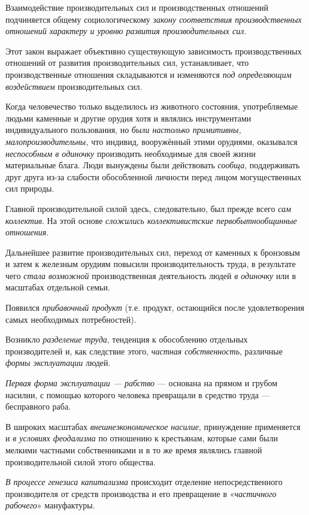 \documentclass[a4paper,14pt,russian]{extreport}
\begin{document}
Взаимодействие производительных сил и производственных отношений подчиняется общему социологическому \emph{закону соответствия производственных отношений характеру и уровню развития производительных сил.}

Этот закон выражает объективно существующую зависимость производственных отношений от развития производительных сил, устанавливает, что производственные отношения складываются и изменяются \emph{под определяющим воздействием} производительных сил.

Когда человечество только выделилось из животного состояния, употребляемые людьми каменные и другие орудия хотя и являлись инструментами индивидуального пользования, но \emph{были настолько примитивны, малопроизводительны,} что индивид, вооружённый этими орудиями, оказывался \emph{неспособным в одиночку} производить необходимые для своей жизни материальные блага. Люди вынуждены были действовать \emph{сообща}, поддерживать друг друга из-за слабости обособленной личности перед лицом могущественных сил природы.

Главной производительной силой здесь, следовательно, был прежде всего \emph{сам коллектив}. На этой основе \emph{сложились коллективистские первобытнообщинные отношения}.

Дальнейшее развитие производительных сил, переход от каменных к бронзовым и затем к железным орудиям повысили производительность труда, в результате чего \emph{стала возможной} производственная деятельность людей \emph{в одиночку} или в масштабах отдельной семьи.

Появился \emph{прибавочный продукт} (т.е. продукт, остающийся после удовлетворения самых необходимых потребностей).

Возникло \emph{разделение труда}, тенденция к обособлению отдельных производителей и, как следствие этого, \emph{частная собственность}, различные \emph{формы эксплуатации} людей.

\emph{Первая форма эксплуатации --- рабство} --- основана на прямом и грубом насилии, с помощью которого человека превращали в средство труда --- бесправного раба.

В широких масштабах \emph{внешнеэкономическое насилие}, принуждение применяется и \emph{в условиях феодализма} по отношению к крестьянам, которые сами были мелкими частными собственниками и в то же время являлись главной производительной силой этого общества.

\emph{В процессе генезиса капитализма} происходит отделение непосредственного производителя от средств производства и его превращение в «\emph{частичного рабочего}» мануфактуры.
\end{document}
